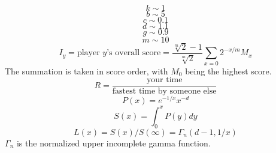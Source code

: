 \begin{equation}k \sim 1\end{equation}
\begin{equation}b \sim 5\end{equation}
\begin{equation}c \sim 0.1\end{equation}
\begin{equation}d \sim 1.1\end{equation}
\begin{equation}g \sim 0.9\end{equation}
\begin{equation}m \sim 10\end{equation}
\begin{equation}I_{y} = \text{player }y \text{'s overall score} = \frac{\sqrt[m]2 - 1}{\sqrt[m]2} \sum_{x = 0}2^{-x/m} M_x \end{equation}
The summation is taken in score order, with $M_0$ being the highest score.
\begin{equation}R = \frac{\text{your time}}{\text{fastest time by someone else}}\end{equation}
\begin{equation}P(x) = e^{-1/x}x^{-d}\end{equation}
\begin{equation}S(x) = \int_{0}^{x} P(y)dy\end{equation}
\begin{equation}L(x) = S(x) / S(\infty) = \Gamma_n (d - 1, 1/x)\end{equation}
$\Gamma_n$ is the normalized upper incomplete gamma function.

